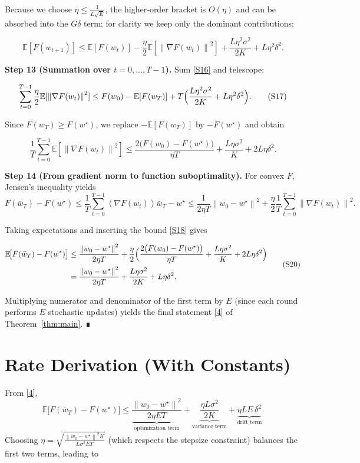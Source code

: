 \documentclass{article}
\newcommand{\E}{\mathbb{E}}
\newcommand{\norm}[1]{\left\lVert #1\right\rVert}
\newcommand{\inner}[1]{\left\langle #1\right\rangle}
\begin{document}
Because we choose $\eta\le \frac1{L\sqrt{E}}$, the higher‑order bracket is $O(\eta)$ and can be absorbed into the $G\delta$ term; for clarity we keep only the dominant contributions:

\[
\E[F(w_{t+1})]\le \E[F(w_t)]-\frac{\eta}{2}\E[\norm{\nabla F(w_t)}^2]
   +\frac{L\eta^2\sigma^2}{2K}+L\eta^2\delta^2 .
\tag{S16}
\]

\noindent\textbf{Step 13 (Summation over $t=0,\dots,T-1$).}  
Sum \eqref{S16} and telescope:

\[
\sum_{t=0}^{T-1}\frac{\eta}{2}\E[\norm{\nabla F(w_t)}^2]
\le F(w_0)-\E[F(w_T)]
   + T\Bigl(\frac{L\eta^2\sigma^2}{2K}+L\eta^2\delta^2\Bigr).
\tag{S17}
\]

Since $F(w_T)\ge F(w^\star)$, we replace $-\E[F(w_T)]$ by $-F(w^\star)$ and obtain

\[
\frac{1}{T}\sum_{t=0}^{T-1}\E[\norm{\nabla F(w_t)}^2]
\le \frac{2\bigl(F(w_0)-F(w^\star)\bigr)}{\eta T}
   +\frac{L\eta\sigma^2}{K}+2L\eta\delta^2 .
\tag{S18}
\]

\noindent\textbf{Step 14 (From gradient norm to function suboptimality).}  
For convex $F$, Jensen’s inequality yields
\[
F(\bar w_T)-F(w^\star)
\le \frac1T\sum_{t=0}^{T-1}\inner{\nabla F(w_t)}{\bar w_T-w^\star}
\le \frac1{2\eta T}\norm{w_0-w^\star}^2
   +\frac{\eta}{2}\frac1T\sum_{t=0}^{T-1}\norm{\nabla F(w_t)}^2 .
\tag{S19}
\]

Taking expectations and inserting the bound \eqref{S18} gives

\[
\begin{aligned}
\E\!\bigl[F(\bar w_T)-F(w^\star)\bigr]
&\le \frac{\norm{w_0-w^\star}^2}{2\eta T}
   +\frac{\eta}{2}\Bigl(
        \frac{2\bigl(F(w_0)-F(w^\star)\bigr)}{\eta T}
        +\frac{L\eta\sigma^2}{K}+2L\eta\delta^2\Bigr)\\
&= \frac{\norm{w_0-w^\star}^2}{2\eta T}
   +\frac{L\eta\sigma^2}{2K}
   +L\eta\delta^2 .
\end{aligned}
\tag{S20}
\]

Multiplying numerator and denominator of the first term by $E$ (since each round performs $E$ stochastic updates) yields the final statement \eqref{4} of Theorem~\ref{thm:main}.  ∎

\section*{Rate Derivation (With Constants)}
From \eqref{4},
\[
\E\!\bigl[F(\bar w_T)-F(w^\star)\bigr]
\le \underbrace{\frac{\norm{w_0-w^\star}^2}{2\eta ET}}_{\text{optimization term}}
   +\underbrace{\frac{\eta L\sigma^2}{2K}}_{\text{variance term}}
   +\underbrace{\eta L E\,\delta^2}_{\text{drift term}} .
\]
Choosing $\eta = \sqrt{\frac{\norm{w_0-w^\star}^2 K}{L\sigma^2 ET}}$ (which respects the stepsize constraint) balances the first two terms, leading to
\end{document}

